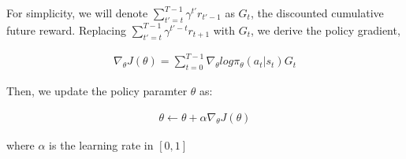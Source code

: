 \documentclass[letterpaper,11pt]{article}
\begin{document}
For simplicity, we will denote ${\sum\limits_{t'=t}^{T-1} \gamma^{t'} r_{t'-1}}$ as $G_{t}$, the discounted cumulative future reward. Replacing ${\sum\limits_{t'=t}^{T-1} \gamma^{t'-t} r_{t+1}}$ with ${G_{t}}$, we derive the policy gradient,

$$
\begin{aligned}
    \nabla_{\theta} J(\theta) = \sum_{t = 0}^{T-1} \nabla_{\theta} log \pi_{\theta} (a_{t} | s_{t}) G_{t}    
\end{aligned}
$$

Then, we update the policy paramter $\theta$ as:

$$
\begin{aligned}
    \theta \gets \theta + \alpha \nabla_{\theta} J(\theta)
\end{aligned}
$$

where $\alpha$ is the learning rate in $[0, 1]$
\end{document}
